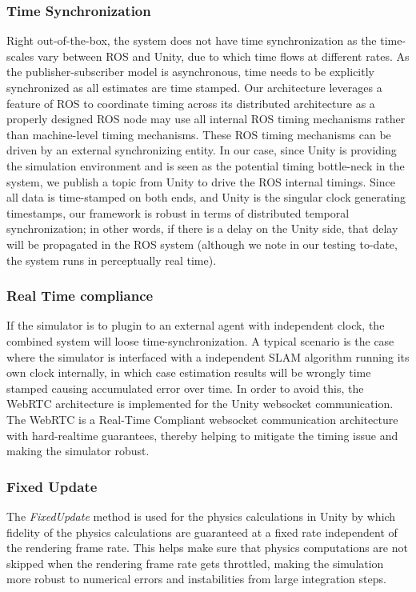 \documentclass[a4paper, 10pt, conference]{ieeeconf}      %
\begin{document}
\subsubsection{Time Synchronization}
Right  out-of-the-box, the system does not have time synchronization as the time-scales vary between ROS and Unity, due to which time flows at different rates. As the publisher-subscriber model is asynchronous, time needs to be explicitly synchronized as all estimates are time stamped. Our architecture leverages a feature of ROS to coordinate timing across its distributed architecture as a properly designed ROS node may use all internal ROS timing mechanisms rather than machine-level timing mechanisms. These ROS timing mechanisms can be driven by an external synchronizing entity. In our case, since Unity is providing the simulation environment and is seen as the potential timing bottle-neck in the system, we publish a topic from Unity to drive the ROS internal timings. Since all data is time-stamped on both ends, and Unity is the singular clock generating timestamps, our framework is robust in terms of distributed temporal synchronization; in other words, if there is a delay on the Unity side, that delay will be propagated in the ROS system (although we note in our testing to-date, the system runs in perceptually real time).
\subsubsection{Real Time compliance}
If the simulator is to plugin to an external agent with independent clock, the combined system will loose time-synchronization. A typical scenario is the case where the simulator is interfaced with a independent SLAM algorithm running its own clock internally, in which case estimation results will be wrongly time stamped causing accumulated error over time. In order to avoid this, the WebRTC architecture\cite{loreto2014real} is implemented for the Unity websocket communication. The WebRTC is a Real-Time Compliant websocket communication architecture with hard-realtime guarantees, thereby helping to mitigate the timing issue  and making the simulator robust. 
\subsubsection{Fixed Update}
The \textit{FixedUpdate} method is used for the physics calculations in Unity by which fidelity of the physics calculations are guaranteed at a fixed rate independent of the rendering frame rate. This helps make sure that physics computations are not skipped when the rendering frame rate gets throttled, making the simulation more robust to numerical errors and instabilities from large integration steps.
\end{document}
